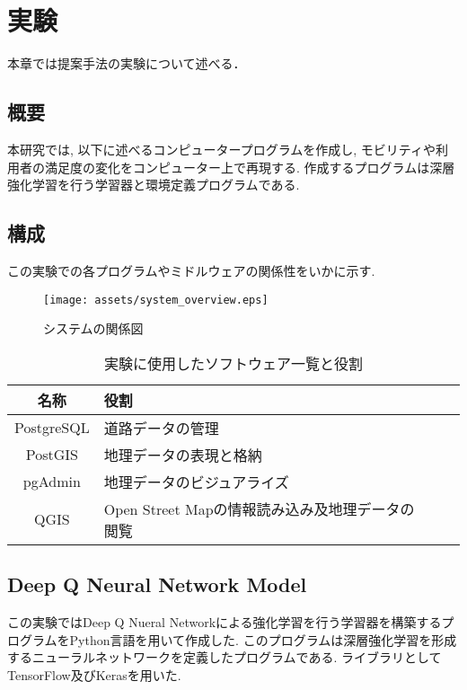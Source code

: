 \chapter{実験}
\label{implementation}

本章では提案手法の実験について述べる．

\section{概要}

本研究では, 以下に述べるコンピュータープログラムを作成し, モビリティや利用者の満足度の変化をコンピューター上で再現する.
作成するプログラムは深層強化学習を行う学習器と環境定義プログラムである.

\section{構成}

この実験での各プログラムやミドルウェアの関係性をいかに示す.


\begin{figure}[H]
  \centering  %
  \texttt{[image: assets/system\_overview.eps]}
  \caption{システムの関係図}  \label{sample}
\end{figure}




\begin{table}[h]
  \caption{実験に使用したソフトウェア一覧と役割}
  \label{table:SpeedOfLight}
  \centering
  \begin{tabular}{clll}
    \hline
      名称 & 役割 \\
      \hline \hline
      PostgreSQL & 道路データの管理 \\
      PostGIS & 地理データの表現と格納 \\
      pgAdmin & 地理データのビジュアライズ \\
      QGIS & Open Street Mapの情報読み込み及地理データの閲覧 \\
    \hline
  \end{tabular}
\end{table}


\section{Deep Q Neural Network Model}

この実験ではDeep Q Nueral Networkによる強化学習を行う学習器を構築するプログラムをPython言語を用いて作成した.
このプログラムは深層強化学習を形成するニューラルネットワークを定義したプログラムである.
ライブラリとしてTensorFlow及びKerasを用いた.


